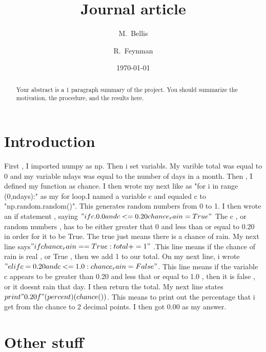 \documentclass[twocolumn]{revtex4}[14t]
\begin{document}
\title{
Journal article
}

\author{M.~Bellis}
\author{R.~Feynman}

\date{\today}

\begin{abstract}
    Your abstract is a 1 paragraph summary of the project.
    You should summarize the motivation, the procedure, and the 
    results here.
\end{abstract}

\maketitle

\section{Introduction}
First , I imported numpy as np. Then i set variabls. My varible total was equal to 0 and my variable ndays was equal to the number of days in a month. Then , I defined my function as chance. I then wrote my next like as "for i in range (0,ndays):" as my for loop.I named a variable c and equaled c to "np.random.random()". This generates random numbers from 0 to 1. I then wrote an if statement , saying $" if c . 0.0 and c <= 0.20 chance_rain = True"$ The c , or random numbers , has to be either greater that 0 and less than or equal to 0.20 in order for it to be True. The true just means there is a chance of rain. My next line says$ "if chance_rain == True: total += 1"$ .This line means if the chance of rain is real , or True , then we add 1 to our total. On my next line, i wrote$ " elif c=0.20 and c<= 1.0: chance_rain = False"$. This line means if the variable c appears to be greater than 0.20 and less that or equal to 1.0 , then it is false , or it doesnt rain that day.
	I then return the total. My next line states $ print  "0.20f"(percent) (chance())$. This means to print out the percentage that i get from the chance to 2 decimal points. I then got 0.00 as my answer.


\section{Other stuff}

\end{document}
